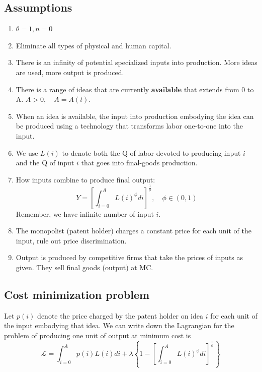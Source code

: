 \documentclass[12pt]{article}
\begin{document}
{\subsection{Assumptions}
\begin{enumerate}
\item 
$ \theta = 1, n = 0 $
\item 
Eliminate all types of physical and human capital.
\item 
There is an infinity of potential specialized inputs into production. More ideas are 
used, more output is produced.
\item 
There is a range of ideas that are currently {\textbf {available}} that extends from
0 to A. $ A > 0, \quad A = A(t) $.
\item When an idea is available, the input into production embodying the idea can be
		produced using a technology that transforms labor one-to-one into the input.
\item 		
We use $ L(i) $ to denote both the Q of labor devoted to producing input $ i $ and
the Q of input $ i $ that goes into final-goods production.
\item How inputs combine to produce final output:
		\begin{equation*}
		Y = \left[ \int_{i = 0}^{A}L(i)^{\phi } d i \right] ^{\frac{1}{\phi}}, \quad
		\phi \in (0,1)
		\end{equation*}
Remember, we have infinite number of input $ i $.
\item 
		The monopolist (patent holder) charges a constant price for each unit of the input,
		rule out price discrimination.
\item 
Output is produced by competitive firms that take the prices of inputs as given.
They sell final goods (output) at MC.
\end{enumerate}


\subsection{Cost minimization problem}
Let $ p(i) $ denote the price charged by the patent holder on idea $ i $ for each
unit of the input embodying that idea. We can write down the Lagrangian for the problem
of producing one unit of output at minimum cost is
\begin{equation*}
\mathscr{L} = \int_{i = 0}^{A} p(i)L(i)d i  +  \lambda
\left\{ 
		1 - \left[ \int_{i = 0}^{A}L(i)^{\phi}d i  \right]^{\frac{1}{\phi}} 
\right\} 
\end{equation*}

}
\end{document}

